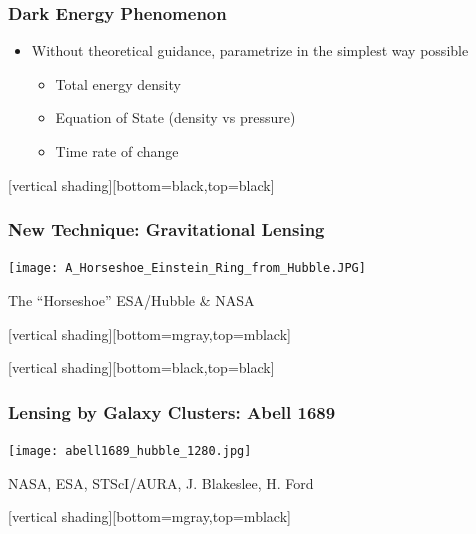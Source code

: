 \documentclass{beamer}
\begin{document}
\frame
{
    \frametitle{Dark Energy Phenomenon}

 
    \begin{itemize}

        \item Without theoretical guidance, parametrize in the simplest way possible

        \begin{itemize}
            \item Total energy density
            \item Equation of State (density vs pressure)
            \item Time rate of change
        \end{itemize}

    \end{itemize}

}


{
    [vertical shading][bottom=black,top=black]
	
    \frame
    {
        \frametitle{New Technique: Gravitational Lensing}

        \begin{center}
            \texttt{[image: A\_Horseshoe\_Einstein\_Ring\_from\_Hubble.JPG]}

            {\tiny \hfill The ``Horseshoe'' ESA/Hubble \& NASA}
        \end{center}
    }

    [vertical shading][bottom=mgray,top=mblack]

}

{
    [vertical shading][bottom=black,top=black]

    \frame
    {
        \frametitle{Lensing by Galaxy Clusters: Abell 1689}

        \begin{center}
            \texttt{[image: abell1689\_hubble\_1280.jpg]}

            {\tiny \hfill NASA, ESA, STScI/AURA, J. Blakeslee, H. Ford}
        \end{center}
    }

    [vertical shading][bottom=mgray,top=mblack]

}
\end{document}
